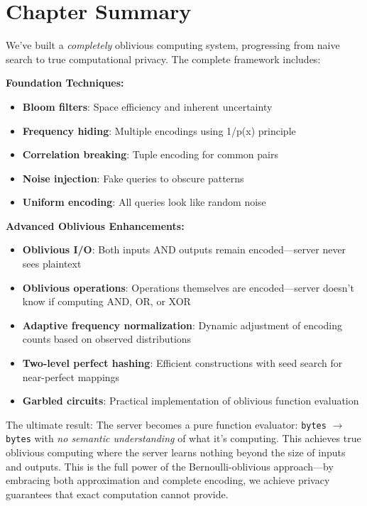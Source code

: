 





\section{Chapter Summary}

We've built a \textit{completely} oblivious computing system, progressing from naive search to true computational privacy. The complete framework includes:

\textbf{Foundation Techniques:}
\begin{itemize}
\item \textbf{Bloom filters}: Space efficiency and inherent uncertainty
\item \textbf{Frequency hiding}: Multiple encodings using 1/p(x) principle  
\item \textbf{Correlation breaking}: Tuple encoding for common pairs
\item \textbf{Noise injection}: Fake queries to obscure patterns
\item \textbf{Uniform encoding}: All queries look like random noise
\end{itemize}

\textbf{Advanced Oblivious Enhancements:}
\begin{itemize}
\item \textbf{Oblivious I/O}: Both inputs AND outputs remain encoded—server never sees plaintext
\item \textbf{Oblivious operations}: Operations themselves are encoded—server doesn't know if computing AND, OR, or XOR
\item \textbf{Adaptive frequency normalization}: Dynamic adjustment of encoding counts based on observed distributions
\item \textbf{Two-level perfect hashing}: Efficient constructions with seed search for near-perfect mappings
\item \textbf{Garbled circuits}: Practical implementation of oblivious function evaluation
\end{itemize}

The ultimate result: The server becomes a pure function evaluator: \texttt{bytes} $\rightarrow$ \texttt{bytes} with \textit{no semantic understanding} of what it's computing. This achieves true oblivious computing where the server learns nothing beyond the size of inputs and outputs. This is the full power of the Bernoulli-oblivious approach—by embracing both approximation and complete encoding, we achieve privacy guarantees that exact computation cannot provide.

